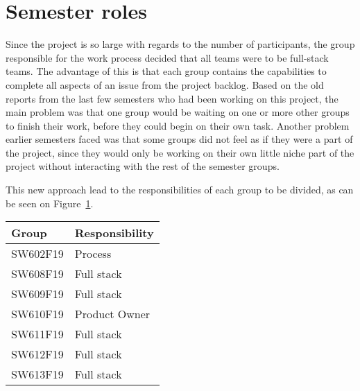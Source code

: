 \section{Semester roles}
Since the project is so large with regards to the number of participants, the group responsible for the work process decided that all teams were to be full-stack teams.
The advantage of this is that each group contains the capabilities to complete all aspects of an issue from the project backlog.
Based on the old reports from the last few semesters who had been working on this project, the main problem was that one group would be waiting on one or more other groups to finish their work, before they could begin on their own task.
Another problem earlier semesters faced was that some groups did not feel as if they were a part of the project, since they would only be working on their own little niche part of the project without interacting with the rest of the semester groups.

This new approach lead to the responsibilities of each group to be divided, as can be seen on Figure~\ref{TBL:GroupResponsibility}.
\begin{table}[H]
\centering
\begin{tabular}{|l|l|}
\hline
\textbf{Group} & \textbf{Responsibility} \\ \hline
SW602F19       & Process                 \\ \hline
SW608F19       & Full stack              \\ \hline
SW609F19       & Full stack              \\ \hline
SW610F19       & Product Owner           \\ \hline
SW611F19       & Full stack              \\ \hline
SW612F19       & Full stack              \\ \hline
SW613F19       & Full stack              \\ \hline
\end{tabular}
\label{TBL:GroupResponsibility}
\end{table}
